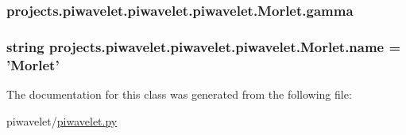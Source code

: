 \hypertarget{classprojects_1_1piwavelet_1_1piwavelet_1_1piwavelet_1_1Morlet_ad72b0cd3389a481379383d4a31c9534f}{
\subsubsection[{gamma}]{\setlength{\rightskip}{0pt plus 5cm}projects.\-piwavelet.\-piwavelet.\-piwavelet.\-Morlet.\-gamma}}\label{classprojects_1_1piwavelet_1_1piwavelet_1_1piwavelet_1_1Morlet_ad72b0cd3389a481379383d4a31c9534f}
\hypertarget{classprojects_1_1piwavelet_1_1piwavelet_1_1piwavelet_1_1Morlet_a54fb1b558bd3f992e78452f41c5582b3}{
\subsubsection[{name}]{\setlength{\rightskip}{0pt plus 5cm}string projects.\-piwavelet.\-piwavelet.\-piwavelet.\-Morlet.\-name = '{\bf Morlet}'\hspace{0.3cm}{\ttfamily [static]}}}\label{classprojects_1_1piwavelet_1_1piwavelet_1_1piwavelet_1_1Morlet_a54fb1b558bd3f992e78452f41c5582b3}


The documentation for this class was generated from the following file\-:\begin{DoxyCompactItemize}
\item 
piwavelet/\hyperlink{piwavelet_8py}{piwavelet.\-py}\end{DoxyCompactItemize}
